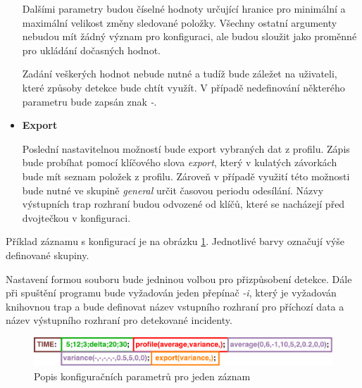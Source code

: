 \begin{itemize}
  Dalšími parametry budou číselné hodnoty určující hranice pro minimální a maximální velikost 
  změny sledované položky. Všechny ostatní argumenty nebudou mít žádný význam pro konfiguraci, ale 
  budou sloužit jako proměnné pro ukládání dočasných hodnot.
  
  Zadání veškerých hodnot nebude nutné a tudíž bude záležet na uživateli, které způsoby detekce 
  bude chtít využít. V případě nedefinování některého parametru bude zapsán znak \textit{-}.
  
  \item \textbf{Export}
  
  Poslední nastavitelnou možností bude export vybraných dat z profilu. Zápis bude probíhat pomocí 
  klíčového slova \textit{export}, který v kulatých závorkách bude mít seznam položek z profilu. Zároveň 
  v případě využití této možnosti bude nutné ve skupině \textit{general} určit časovou periodu
  odesílání.
  Názvy výstupních trap rozhraní
  budou odvozené od klíčů, které se nacházejí před dvojtečkou v konfiguraci.
  
 \end{itemize}

 Příklad záznamu s konfigurací je na obrázku \ref{obr.config}. Jednotlivé barvy označují 
 výše definované skupiny. 
 
 Nastavení formou
 souboru bude jedninou volbou pro přizpůsobení detekce. Dále při 
 spuštění programu bude vyžadován jeden přepínač \textit{-i}, který je vyžadován knihovnou trap a 
 bude definovat název vstupního
 rozhraní pro příchozí data a název výstupního rozhraní pro detekované incidenty. 
 
   \begin{figure}[ht]
   \begin{center}
   \includegraphics[scale=0.5]{pictures/config-file-frame}
   \caption{Popis konfiguračních parametrů pro jeden záznam}
   \label{obr.config}
   \end{center}
   \end{figure}
 
